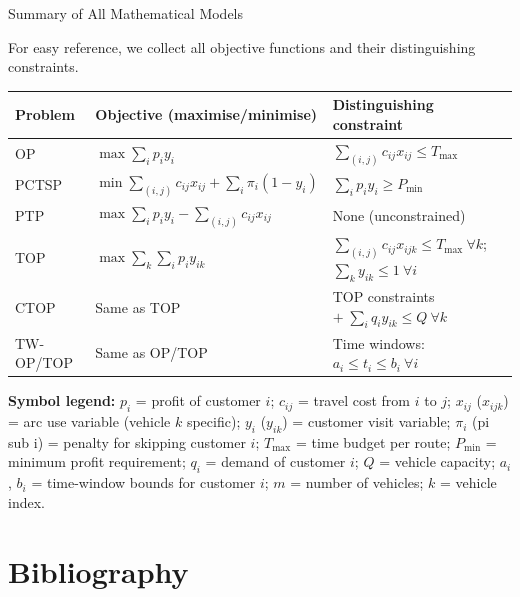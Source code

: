 \documentclass[aspectratio=169,10pt]{beamer}
\begin{document}
\begin{frame}[allowframebreaks]{Summary of All Mathematical Models}

  For easy reference, we collect all objective functions and their
  distinguishing constraints.

  \medskip
  \begin{center}
  \renewcommand{\arraystretch}{1.5}
  \small
  \begin{tabular}{p{2.2cm} p{5.8cm} p{4.5cm}}
    \toprule
    \textbf{Problem} & \textbf{Objective (maximise/minimise)} & \textbf{Distinguishing constraint} \\
    \midrule
    OP &
    $\max \displaystyle\sum_{i} p_i y_i$ &
    $\displaystyle\sum_{(i,j)} c_{ij} x_{ij} \le T_{\max}$ \\
    PCTSP &
    $\min \displaystyle\sum_{(i,j)} c_{ij} x_{ij} + \sum_{i} \pi_i(1-y_i)$ &
    $\displaystyle\sum_{i} p_i y_i \ge P_{\min}$ \\
    PTP &
    $\max \displaystyle\sum_{i} p_i y_i - \sum_{(i,j)} c_{ij} x_{ij}$ &
    None (unconstrained) \\
    TOP &
    $\max \displaystyle\sum_{k}\sum_{i} p_i y_{ik}$ &
    $\displaystyle\sum_{(i,j)} c_{ij} x_{ijk} \le T_{\max}\ \forall k$;
    $\displaystyle\sum_k y_{ik} \le 1\ \forall i$ \\
    CTOP &
    Same as TOP &
    TOP constraints $+\; \displaystyle\sum_i q_i y_{ik} \le Q\ \forall k$ \\
    TW-OP/TOP &
    Same as OP/TOP &
    Time windows: $a_i \le t_i \le b_i\ \forall i$ \\
    \bottomrule
  \end{tabular}
  \end{center}

  \medskip
  \textbf{Symbol legend:}
  $p_i$ = profit of customer $i$;
  $c_{ij}$ = travel cost from $i$ to $j$;
  $x_{ij}$ ($x_{ijk}$) = arc use variable (vehicle $k$ specific);
  $y_i$ ($y_{ik}$) = customer visit variable;
  $\pi_i$ (pi sub i) = penalty for skipping customer $i$;
  $T_{\max}$ = time budget per route;
  $P_{\min}$ = minimum profit requirement;
  $q_i$ = demand of customer $i$;
  $Q$ = vehicle capacity;
  $a_i$, $b_i$ = time-window bounds for customer $i$;
  $m$ = number of vehicles;
  $k$ = vehicle index.

\end{frame}

\section{Bibliography}
\end{document}
